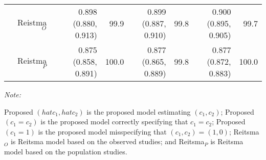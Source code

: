 \begin{table}
\begin{threeparttable}
\begin{tabular}[t]{rrrrrrrrr}
 & Reistma$_O$ &  & 0.898 (0.880, 0.913) & 99.9 & 0.899 (0.887, 0.910) & 99.8 & 0.900 (0.895, 0.905) & 99.7\\
 & Reistma$_P$ &  & 0.875 (0.858, 0.891) & 100.0 & 0.877 (0.865, 0.889) & 99.8 & 0.877 (0.872, 0.883) & 100.0\\
\bottomrule
\end{tabular}
\begin{tablenotes}
\item \textit{Note: } 
\item Proposed $({hat{c}_1, hat{c}_2})$ is the proposed model estimating $(c_1, c_2)$;
   Proposed $(c_1 = c_2)$ is the proposed model correctly specifying that $c_1=c_2$;
   Proposed $(c_1 = 1)$ is the proposed model misspecifying that $(c_1, c_2) = (1,0)$;
   Reitsma$_O$ is Reitsma model based on the observed studies;
   and Reitsma$_P$ is Reitsma model based on the population studies.
\end{tablenotes}
\end{threeparttable}
\end{table}
